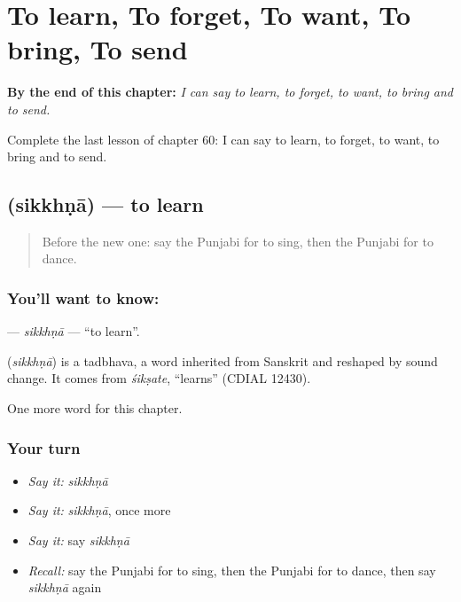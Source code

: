 
\chapter{To learn, To forget, To want, To bring, To send}
\label{ch:pa-to-learn-to-forget-to-want-to-bring-to-send}

\begin{chapteropening}
\textbf{By the end of this chapter:} \emph{I can say to learn, to forget, to want, to bring and to send.}

Complete the last lesson of chapter 60: I can say to learn, to forget, to want, to bring and to send.
\end{chapteropening}

\section[\texorpdfstring{\pa{ਸਿੱਖਣਾ} (sikkhṇā)}{ਸਿੱਖਣਾ (sikkhṇā)}]{ (sikkhṇā) — to learn}

\label{lesson:PA-C60-sikkhna}



\begin{quote}
Before the new one: say the Punjabi for to sing, then the Punjabi for to dance.
\end{quote}

\subsection*{You'll want to know: }
\textbf{} — \emph{sikkhṇā} — \textquotedblleft{}to learn\textquotedblright{}.

\begin{cousinweb}
\textbf{} (\emph{sikkhṇā}) is a tadbhava, a word inherited from Sanskrit and reshaped by sound change. It comes from \emph{śikṣate}, \textquotedblleft{}learns\textquotedblright{} (CDIAL 12430).
\end{cousinweb}

\begin{grammarlens}[title={What you've built}]
One more word for this chapter.
\end{grammarlens}

\subsection*{Your turn}
\begin{itemize}
\raggedright
  \item \emph{Say it:} \emph{sikkhṇā}
  \item \emph{Say it:} \emph{sikkhṇā}, once more
  \item \emph{Say it:} say \emph{sikkhṇā}
  \item \emph{Recall:} say the Punjabi for to sing, then the Punjabi for to dance, then say \emph{sikkhṇā} again
\end{itemize}

